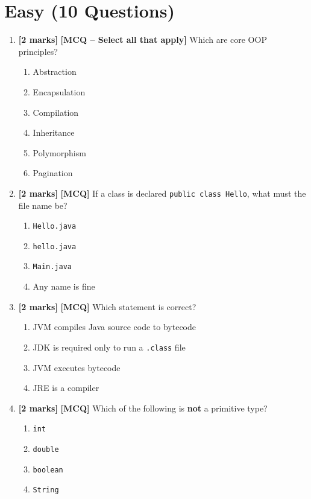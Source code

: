 \documentclass[11pt,a4paper]{article}
\newcommand{\EMarks}{\textbf{[2 marks]} }
\begin{document}
\section*{Easy (10 Questions)}
\begin{enumerate}[label=\textbf{E\arabic*.}, leftmargin=*]
  \item \EMarks \textbf{[MCQ -- Select all that apply]} Which are core OOP principles?
    \begin{enumerate}[label=(\Alph*), leftmargin=*]
      \item Abstraction
      \item Encapsulation
      \item Compilation
      \item Inheritance
      \item Polymorphism
      \item Pagination
    \end{enumerate}

  \item \EMarks \textbf{[MCQ]} If a class is declared \texttt{public class Hello}, what must the file name be?
    \begin{enumerate}[label=(\Alph*), leftmargin=*]
      \item \texttt{Hello.java}
      \item \texttt{hello.java}
      \item \texttt{Main.java}
      \item Any name is fine
    \end{enumerate}

  \item \EMarks \textbf{[MCQ]} Which statement is correct?
    \begin{enumerate}[label=(\Alph*), leftmargin=*]
      \item JVM compiles Java source code to bytecode
      \item JDK is required only to run a \texttt{.class} file
      \item JVM executes bytecode
      \item JRE is a compiler
    \end{enumerate}

  \item \EMarks \textbf{[MCQ]} Which of the following is \textbf{not} a primitive type?
    \begin{enumerate}[label=(\Alph*), leftmargin=*]
      \item \texttt{int}
      \item \texttt{double}
      \item \texttt{boolean}
      \item \texttt{String}
    \end{enumerate}


\end{enumerate}
\end{document}
